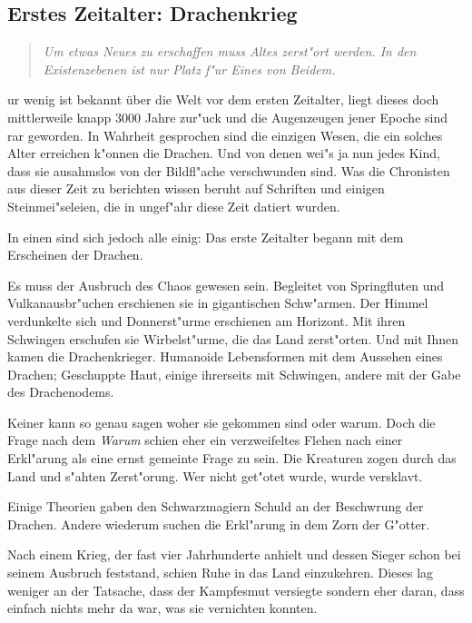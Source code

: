 \subsection{Erstes Zeitalter: Drachenkrieg}
\begin{quotation}
\par\textit{\glqq Um etwas Neues zu erschaffen muss Altes zerst"ort werden. In den Existenzebenen ist nur Platz f"ur Eines von Beidem. \grqq}
\end{quotation}
ur wenig ist
bekannt über die Welt vor dem ersten Zeitalter, liegt dieses doch mittlerweile knapp 3000 Jahre zur"uck und
die Augenzeugen jener Epoche sind rar geworden. In
Wahrheit gesprochen sind die einzigen Wesen, die ein solches Alter
erreichen k"onnen die Drachen. Und von denen wei"s
ja nun jedes Kind, dass sie ausahmslos von der Bildfl"ache
verschwunden sind. Was die Chronisten aus dieser
Zeit zu berichten wissen beruht auf Schriften und einigen
Steinmei"seleien, die in ungef"ahr diese Zeit datiert wurden.
\par In einen sind sich jedoch alle einig: Das erste Zeitalter begann mit dem Erscheinen der Drachen.
\par Es muss der Ausbruch des Chaos gewesen sein.
Begleitet von Springfluten und Vulkanausbr"uchen erschienen sie in gigantischen Schw"armen.
Der Himmel verdunkelte sich und Donnerst"urme erschienen am Horizont.
Mit ihren Schwingen erschufen sie Wirbelst"urme, die das Land zerst"orten.
Und mit Ihnen kamen die Drachenkrieger.
Humanoide Lebensformen mit dem Aussehen eines Drachen;
Geschuppte Haut, einige ihrerseits mit Schwingen, andere mit der Gabe des Drachenodems.
\par Keiner kann so genau sagen woher sie gekommen sind oder warum. Doch die Frage nach dem \textit{Warum} schien eher ein verzweifeltes Flehen nach einer Erkl"arung als eine ernst gemeinte Frage zu sein. Die Kreaturen zogen durch das Land und s"ahten Zerst"orung. Wer nicht get"otet wurde, wurde versklavt.
\par Einige Theorien gaben den Schwarzmagiern Schuld an der Beschwrung der Drachen. Andere wiederum suchen die Erkl"arung in dem Zorn der G"otter.
\par Nach einem Krieg, der fast vier Jahrhunderte anhielt und dessen Sieger schon bei seinem Ausbruch feststand, schien Ruhe in das Land einzukehren. Dieses lag weniger an der Tatsache, dass der Kampfesmut versiegte sondern eher daran, dass einfach nichts mehr da war, was sie vernichten konnten.

